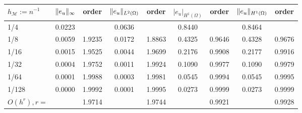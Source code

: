 \begin{tabular}{lcccccccc}
    \hline
    $h_\mathcal{M}:=n^{-1}$ & $\lVert e_u\rVert_\infty$ & order & 
    $\lVert e_u\rVert_{L^2(\Omega)}$ & order & $|e_u|_{H^1(\Omega)}$ & order &
    $\lVert e_u\rVert_{H^1(\Omega)}$ & order \Tstrut\Bstrut \\
    \hline
      1/4    &0.0223    &          &0.0636    &          &0.8440    &          &0.8464    &      \Tstrut\\
      1/8    &0.0059    &1.9235    &0.0172    &1.8863    &0.4325    &0.9646    &0.4328    &0.9676\\
     1/16    &0.0015    &1.9525    &0.0044    &1.9699    &0.2176    &0.9908    &0.2177    &0.9916\\
     1/32    &0.0004    &1.9752    &0.0011    &1.9924    &0.1090    &0.9977    &0.1090    &0.9979\\
     1/64    &0.0001    &1.9988    &0.0003    &1.9981    &0.0545    &0.9994    &0.0545    &0.9995\\
    1/128    &0.0000    &1.9992    &0.0001    &1.9995    &0.0273    &0.9999    &0.0273    &0.9999\Bstrut\\ \hline\Tstrut
$O(h^r),r=$  &          &1.9714    &          &1.9744    &          &0.9921    &          &0.9928\Bstrut\\ 
    \hline
\end{tabular}
